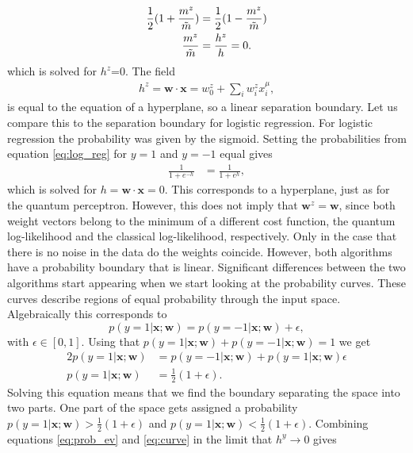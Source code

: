 \begin{align}
    \frac{1}{2}(1 + \frac{m^z}{\Tilde{m}}) &= \frac{1}{2}(1 - \frac{m^z}{\Tilde{m}})\nonumber\\
    \frac{m^z}{\Tilde{m}}& = \frac{h^z}{h} = 0\label{eq:hz_h}.
\end{align}
which is solved for $h^z$=0. The field
\begin{align*}
    h^z = \mathbf{w}\cdot\mathbf{x} =  w_0^z + \sum_i w_i^z x_i^\mu,
\end{align*}
is equal to the equation of a hyperplane, so a linear separation boundary. Let us compare this to the separation boundary for logistic regression. For logistic regression the probability was given by the sigmoid. Setting the probabilities from equation \ref{eq:log_reg} for $y=1$ and $y=-1$ equal gives
\begin{align*}
    \frac{1}{1+e^{-h}} &= \frac{1}{1+e^{h}},
\end{align*}
which is solved for $h=\mathbf{w}\cdot\mathbf{x}=0$. This corresponds to a hyperplane, just as for the quantum perceptron. However, this does not imply that $\mathbf{w}^z = \mathbf{w}$, since both weight vectors belong to the minimum of a different cost function, the quantum log-likelihood and the classical log-likelihood, respectively. Only in the case that there is no noise in the data do the weights coincide. However, both algorithms have a probability boundary that is linear. Significant differences between the two algorithms start appearing when we start looking at the probability curves. These curves describe regions of equal probability through the input space. Algebraically this corresponds to
\begin{equation}
    p(y=1|\mathbf{x};\mathbf{w}) = p(y=-1|\mathbf{x};\mathbf{w})+ \epsilon  \label{eq:p_eps},
\end{equation}
with $\epsilon\in [0,1]$. Using that $p(y=1|\mathbf{x};\mathbf{w}) + p(y=-1|\mathbf{x};\mathbf{w}) = 1$ we get
\begin{align}
    2p(y=1|\mathbf{x};\mathbf{w})& = p(y=-1|\mathbf{x};\mathbf{w}) + p(y=1|\mathbf{x};\mathbf{w})\epsilon \nonumber\\
    p(y=1|\mathbf{x};\mathbf{w}) &= \frac{1}{2}(1 + \epsilon)\label{eq:curve}.
\end{align}
Solving this equation means that we find the boundary separating the space into two parts. One part of the space gets assigned a probability $p(y=1|\mathbf{x};\mathbf{w})>\frac{1}{2}(1 + \epsilon)$ and $p(y=1|\mathbf{x};\mathbf{w})<\frac{1}{2}(1 + \epsilon)$. Combining equations \ref{eq:prob_ev} and \ref{eq:curve} in the limit that $h^y \to 0$ gives
